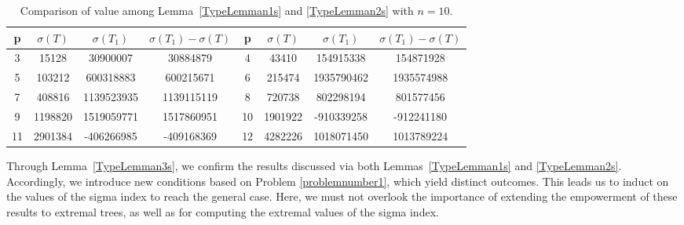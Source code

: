 \documentclass[12pt, a4paper]{article}
\theoremstyle{plain}  %
\theoremstyle{definition}  %
\begin{document}
\begin{table}[H]
    \centering
\begin{tabular}{|c|c|c|c||c|c|c|c|}
\hline
p & $\sigma(T)$ & $\sigma(T_1)$ & $\sigma(T_1)-\sigma(T)$ & p & $\sigma(T)$ & $\sigma(T_1)$ & $\sigma(T_1)-\sigma(T)$ \\ \hline
3 & 15128 & 30900007 & 30884879 &4 & 43410 & 154915338 & 154871928 \\ \hline
5 & 103212 & 600318883 & 600215671&6 & 215474 & 1935790462 & 1935574988 \\ \hline
7 & 408816 & 1139523935 & 1139115119 &8 & 720738 & 802298194 & 801577456 \\ \hline
9 & 1198820 & 1519059771 & 1517860951 &10 & 1901922 & -910339258 & -912241180 \\ \hline
11 & 2901384 & -406266985 & -409168369 &12 & 4282226 & 1018071450 & 1013789224 \\ \hline
\end{tabular}
\caption{Comparison of value among Lemma~\ref{TypeLemman1s} and \ref{TypeLemman2s} with $n=10$.}
\label{tab001ComparisonVal}
\end{table}

Through Lemma~\ref{TypeLemman3s}, we confirm the results discussed via both Lemmas~\ref{TypeLemman1s} and \ref{TypeLemman2s}. Accordingly, we introduce new conditions based on Problem \ref{problemnumber1}, which yield distinct outcomes. This leads us to induct on the values of the sigma index to reach the general case. Here, we must not overlook the importance of extending the empowerment of these results to extremal trees, as well as for computing the extremal values of the sigma index.
\end{document}
